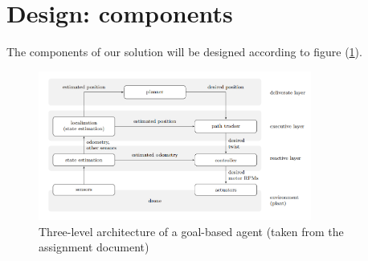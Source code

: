 \documentclass[a4paper,footsepline]{scrartcl}
\begin{document}
\section*{Design: components}
The components of our solution will be designed according to figure (\ref{fig:layers}). 
\begin{figure}
	\centering
	\includegraphics[width=0.8\textwidth]{images/figure.png}
	\caption{Three-level architecture of a goal-based agent (taken from the assignment document)}
	\label{fig:layers}
\end{figure}
\end{document}
